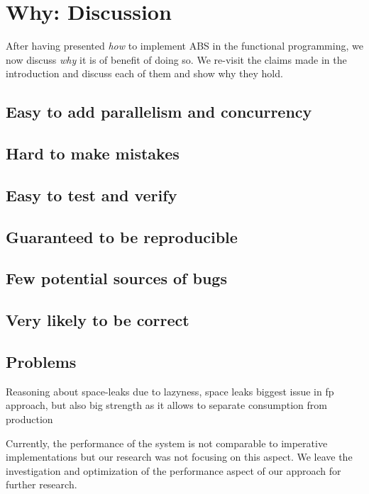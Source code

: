 \section{Why: Discussion}
After having presented \textit{how} to implement ABS in the functional programming, we now discuss \textit{why} it is of benefit of doing so. We re-visit the claims made in the introduction and discuss each of them and show why they hold.

\subsection{Easy to add parallelism and concurrency}

\subsection{Hard to make mistakes}

\subsection{Easy to test and verify}
\cite{perez_testing_2017, perez_back_2017}

\subsection{Guaranteed to be reproducible}

\subsection{Few potential sources of bugs}

\subsection{Very likely to be correct}

\subsection{Problems}
Reasoning about space-leaks due to lazyness, space leaks biggest issue in fp approach, but also big strength as it allows to separate consumption from production

Currently, the performance of the system is not comparable to imperative implementations but our research was not focusing on this aspect. We leave the investigation and optimization of the performance aspect of our approach for further research.

